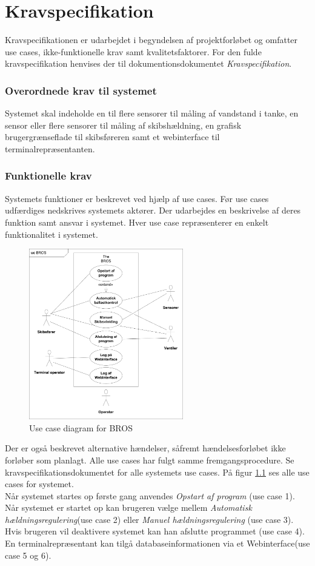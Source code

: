 \chapter{Kravspecifikation}
\label{ch:kravspecikikation}
Kravspecifikationen er udarbejdet i begyndelsen af projektforløbet og omfatter use cases, ikke-funktionelle krav samt kvalitetsfaktorer. For den fulde kravspecifikation henvises der til dokumentionsdokumentet \textit{Kravspecifikation}.

\subsection{Overordnede krav til systemet}
Systemet skal indeholde en til flere sensorer til måling af vandstand i tanke, en sensor eller flere sensorer til måling af skibshældning, en grafisk brugergrænseflade til skibsføreren samt et webinterface til terminalrepræsentanten.

\subsection{Funktionelle krav}
Systemets funktioner er beskrevet ved hjælp af use cases. Før use cases udfærdiges nedskrives systemets aktører. Der udarbejdes en beskrivelse af deres funktion samt ansvar i systemet. Hver use case repræsenterer en enkelt funktionalitet i systemet.
\begin{figure}[H]
\centering
\includegraphics[width=0.6\textwidth]{billeder/UCDBROS}
\caption{Use case diagram for BROS}
\label{fig:UCDBROS}
\end{figure}
Der er også beskrevet alternative hændelser, såfremt hændelsesforløbet ikke forløber som planlagt. Alle use cases har fulgt samme fremgangsprocedure. Se kravspecifikationsdokumentet for alle systemets use cases. På figur \ref{fig:UCDBROS} ses alle use cases for systemet.\\
Når systemet startes op første gang anvendes \textit{Opstart af program} (use case 1). Når systemet er startet op kan brugeren vælge mellem \textit{Automatisk hældningsregulering}(use case 2) eller \textit{Manuel hældningsregulering} (use case 3). Hvis brugeren vil deaktivere systemet kan han afslutte programmet (use case 4). En terminalrepræsentant kan tilgå databaseinformationen via et Webinterface(use case 5 og 6).



